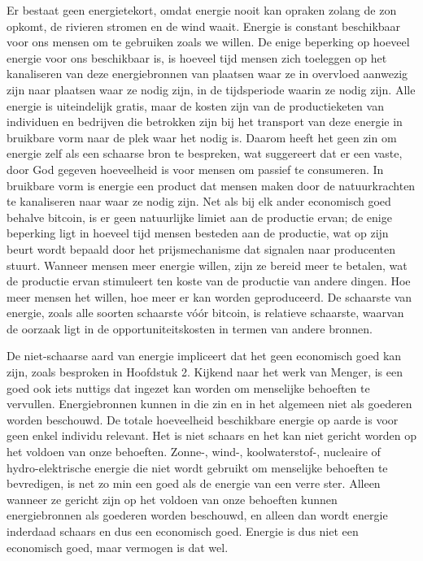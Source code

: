 \documentclass[
  a5paper,
  smalldemyvopaper,11pt,twoside,onecolumn,openright,extrafontsizes,
hidelinks]{memoir}
\begin{document}
Er bestaat geen energietekort, omdat energie nooit kan opraken zolang de
zon opkomt, de rivieren stromen en de wind waait. Energie is constant
beschikbaar voor ons mensen om te gebruiken zoals we willen. De enige
beperking op hoeveel energie voor ons beschikbaar is, is hoeveel tijd
mensen zich toeleggen op het kanaliseren van deze energiebronnen van
plaatsen waar ze in overvloed aanwezig zijn naar plaatsen waar ze nodig
zijn, in de tijdsperiode waarin ze nodig zijn. Alle energie is
uiteindelijk gratis, maar de kosten zijn van de productieketen van
individuen en bedrijven die betrokken zijn bij het transport van deze
energie in bruikbare vorm naar de plek waar het nodig is. Daarom heeft
het geen zin om energie zelf als een schaarse bron te bespreken, wat
suggereert dat er een vaste, door God gegeven hoeveelheid is voor mensen
om passief te consumeren. In bruikbare vorm is energie een product dat
mensen maken door de natuurkrachten te kanaliseren naar waar ze nodig
zijn. Net als bij elk ander economisch goed behalve bitcoin, is er geen
natuurlijke limiet aan de productie ervan; de enige beperking ligt in
hoeveel tijd mensen besteden aan de productie, wat op zijn beurt wordt
bepaald door het prijsmechanisme dat signalen naar producenten stuurt.
Wanneer mensen meer energie willen, zijn ze bereid meer te betalen, wat
de productie ervan stimuleert ten koste van de productie van andere
dingen. Hoe meer mensen het willen, hoe meer er kan worden geproduceerd.
De schaarste van energie, zoals alle soorten schaarste vóór bitcoin, is
relatieve schaarste, waarvan de oorzaak ligt in de opportuniteitskosten
in termen van andere bronnen.

De niet-schaarse aard van energie impliceert dat het geen economisch
goed kan zijn, zoals besproken in Hoofdstuk 2. Kijkend naar het werk van
Menger, is een goed ook iets nuttigs dat ingezet kan worden om
menselijke behoeften te vervullen. Energiebronnen kunnen in die zin en
in het algemeen niet als goederen worden beschouwd. De totale
hoeveelheid beschikbare energie op aarde is voor geen enkel individu
relevant. Het is niet schaars en het kan niet gericht worden op het
voldoen van onze behoeften. Zonne-, wind-, koolwaterstof-, nucleaire of
hydro-elektrische energie die niet wordt gebruikt om menselijke
behoeften te bevredigen, is net zo min een goed als de energie van een
verre ster. Alleen wanneer ze gericht zijn op het voldoen van onze
behoeften kunnen energiebronnen als goederen worden beschouwd, en alleen
dan wordt energie inderdaad schaars en dus een economisch goed. Energie
is dus niet een economisch goed, maar vermogen is dat wel.
\end{document}
